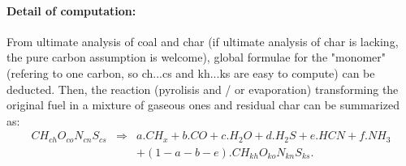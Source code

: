 \paragraph{Detail of computation:}
From ultimate analysis of coal and char (if ultimate
analysis of char is lacking, the pure carbon assumption is welcome), global
formulae for the "monomer" (refering to one carbon, so ch...cs and kh...ks are
easy to compute) can be deducted. Then, the reaction (pyrolisis and / or
evaporation) transforming the original fuel in a mixture of gaseous ones and
residual char can be summarized as:
\begin{eqnarray*}
CH_{ch}O_{co}N_{cn}S_{cs} & \Rightarrow & a . CH_{x} + b . CO + c . H_{2}O + d . H_{2}S + e . HCN + f . NH_{3} \\
                          &             & + (1-a-b-e) . CH_{kh}O_{ko}N_{kn}S_{ks}.
\end{eqnarray*}

